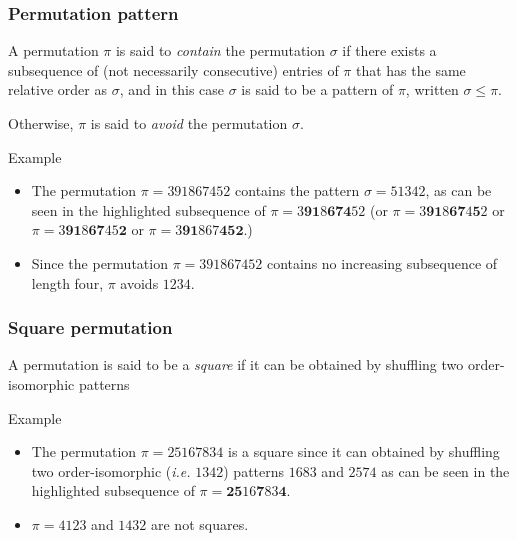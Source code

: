 \documentclass[unknownkeysallowed,10pt,xcolor={dvipsnames}]{beamer}
\begin{document}
\begin{frame}
  \frametitle{Permutation pattern}

  \begin{definition}
    A permutation $\pi$ is said to \emph{contain} the permutation $\sigma$ if there
    exists a subsequence of (not necessarily consecutive) entries of $\pi$ that
    has the same relative order as $\sigma$, and in this case $\sigma$ is said
    to be a pattern of $\pi$, written $\sigma \leq \pi$.

    \medskip

    Otherwise, $\pi$ is said to \emph{avoid} the permutation $\sigma$.
  \end{definition}

  \medskip

  \begin{exampleblock}{Example}
    \begin{itemize}
      \item
        The permutation $\pi = 391867452$ contains the pattern $\sigma = 51342$,
        as can be seen in the highlighted subsequence of
        $\pi = 3\mathbf{91}8\mathbf{674}52$
        (or $\pi = 3\mathbf{91}8\mathbf{67}4\mathbf{5}2$ or
        $\pi = 3\mathbf{91}8\mathbf{67}45\mathbf{2}$ or
        $\pi = 3\mathbf{91}867\mathbf{452}$.)

      \item
       Since the permutation $\pi = 391867452$ contains no increasing subsequence
       of length four, $\pi$ avoids $1234$.
    \end{itemize}
  \end{exampleblock}

\end{frame}


\begin{frame}
  \frametitle{Square permutation}

  \begin{definition}
    A permutation is said to be a \emph{square} if it can be obtained by
    shuffling two order-isomorphic patterns
  \end{definition}

  \medskip

  \begin{exampleblock}{Example}
    \begin{itemize}
      \item
        The permutation $\pi = 25167834$ is a square since it can obtained by
        shuffling two order-isomorphic (\emph{i.e.} $1342$)
        patterns $1683$ and $2574$ as can be seen in the highlighted subsequence of
        $\pi = \mathbf{25}16\mathbf{7}83\mathbf{4}$.

      \medskip

      \item
       $\pi = 4123$ and $1432$ are not squares.
    \end{itemize}
  \end{exampleblock}

\end{frame}
\end{document}
